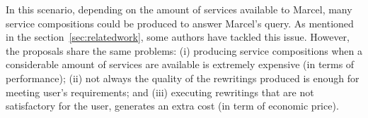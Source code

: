 In this scenario, depending on the amount of services available to Marcel, many service compositions could be produced to answer Marcel's query. As mentioned in the section~\ref{sec:relatedwork}, some authors have tackled this issue. However, the proposals share the same problems: (i) producing service compositions when a considerable amount of services are available
is extremely expensive (in terms of performance); (ii) not always the quality of the rewritings produced is enough for meeting user's requirements; and (iii) executing rewritings that are not satisfactory for the user, generates an extra cost (in term of economic price).

%
%
